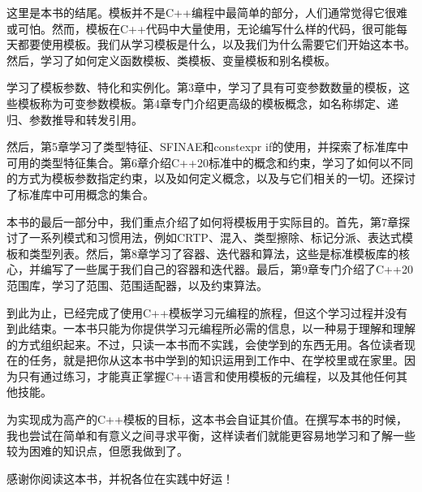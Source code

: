 这里是本书的结尾。模板并不是C++编程中最简单的部分，人们通常觉得它很难或可怕。然而，模板在C++代码中大量使用，无论编写什么样的代码，很可能每天都要使用模板。我们从学习模板是什么，以及我们为什么需要它们开始这本书。然后，学习了如何定义函数模板、类模板、变量模板和别名模板。

学习了模板参数、特化和实例化。第3章中，学习了具有可变参数数量的模板，这些模板称为可变参数模板。第4章专门介绍更高级的模板概念，如名称绑定、递归、参数推导和转发引用。

然后，第5章学习了类型特征、SFINAE和constexpr if的使用，并探索了标准库中可用的类型特征集合。第6章介绍C++20标准中的概念和约束，学习了如何以不同的方式为模板参数指定约束，以及如何定义概念，以及与它们相关的一切。还探讨了标准库中可用概念的集合。

本书的最后一部分中，我们重点介绍了如何将模板用于实际目的。首先，第7章探讨了一系列模式和习惯用法，例如CRTP、混入、类型擦除、标记分派、表达式模板和类型列表。然后，第8章学习了容器、迭代器和算法，这些是标准模板库的核心，并编写了一些属于我们自己的容器和迭代器。最后，第9章专门介绍了C++20范围库，学习了范围、范围适配器，以及约束算法。

到此为止，已经完成了使用C++模板学习元编程的旅程，但这个学习过程并没有到此结束。一本书只能为你提供学习元编程所必需的信息，以一种易于理解和理解的方式组织起来。不过，只读一本书而不实践，会使学到的东西无用。各位读者现在的任务，就是把你从这本书中学到的知识运用到工作中、在学校里或在家里。因为只有通过练习，才能真正掌握C++语言和使用模板的元编程，以及其他任何其他技能。

为实现成为高产的C++模板的目标，这本书会自证其价值。在撰写本书的时候，我也尝试在简单和有意义之间寻求平衡，这样读者们就能更容易地学习和了解一些较为困难的知识点，但愿我做到了。

感谢你阅读这本书，并祝各位在实践中好运！


